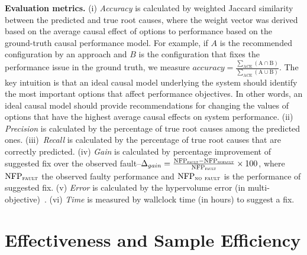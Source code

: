 \noindent
\textbf{Evaluation metrics.}
(i) \emph{Accuracy} is calculated by weighted Jaccard similarity between the predicted and true root causes, where the weight vector was derived based on the average causal effect of options to performance based on the ground-truth causal performance model. For example, if  $A$ is the recommended configuration by an approach and $B$ is the configuration that fixes the performance issue in the ground truth, we measure $accuracy=\frac{\sum_{\text{ACE}} (\text{A} \cap \text{B})}{\sum_{\text{ACE}} (\text{A} \cup \text{B})}$. The key intuition is that an ideal causal model underlying the system should identify the most important options that affect performance objectives. In other words, an ideal causal model should provide recommendations for changing the values of options that have the highest average causal effects on system performance. (ii) \emph{Precision} is calculated by the percentage of true root causes among the predicted ones.  (iii)~\emph{Recall} is calculated by the percentage of true root causes that are correctly predicted.
(iv) \emph{Gain} is calculated by percentage improvement of suggested fix over the observed fault--$\Delta_{gain}=\frac{\text{NFP}_\textsc{fault}-\text{NFP}_\textsc{nofault}}{\text{NFP}_\textsc{fault}}\times 100$, where $\text{NFP}_{\textsc{fault}}$ the observed faulty performance and $\text{NFP}_{\textsc{no}~\textsc{fault}}$ is the performance of suggested fix. (v) \emph{Error} is calculated by the hypervolume error (in multi-objective)~\cite{zitzler2007hypervolume}.  (vi) \emph{Time} is measured by wallclock time (in hours) to suggest a fix.


\section{Effectiveness and Sample Efficiency}
\label{sec:effectiveness}


